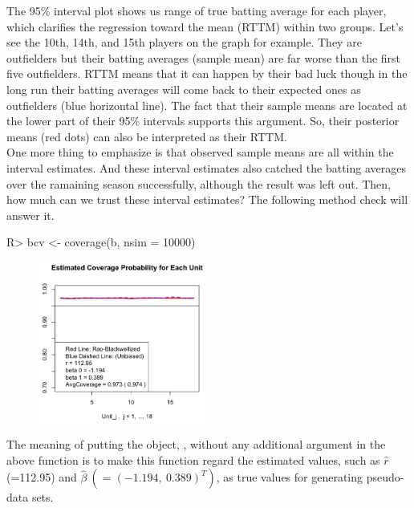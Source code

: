 \documentclass[article]{jss}
\begin{document}
The 95\% interval plot shows us range of true batting average for each player, which clarifies the regression toward the mean (RTTM) within two groups. Let's see the 10th, 14th, and 15th players on the graph for example. They are outfielders but their batting averages (sample mean) are far worse than the first five outfielders. RTTM means that it can happen by their bad luck though in the long run their batting averages will come back to their expected ones as outfielders (blue horizontal line). The fact that their sample means are located at the lower part of their 95\% intervals supports this argument. So, their posterior means (red dots) can also be interpreted as their RTTM. 
\\

One more thing to emphasize is that observed sample means are all within the interval estimates. And these interval estimates also catched the batting averages over the ramaining season successfully, although the result was left out. Then, how much can we trust these interval estimates? The following method check will answer it. 

\begin{CodeChunk}
\begin{CodeInput}
R> bcv <- coverage(b, nsim = 10000)
\end{CodeInput}
\end{CodeChunk}
\begin{figure}[h]
\begin{center}
\includegraphics[width = 5.5cm]{baseball2.png}
\end{center}
\end{figure}

The meaning of putting the  object, , without any additional argument in the above  function is to make this function regard the estimated values, such as $\hat{r}$ (=112.95) and $\hat{\beta}~(=(-1.194, ~0.389)^{T})$, as true values for generating pseudo-data sets. 
\\
\end{document}
